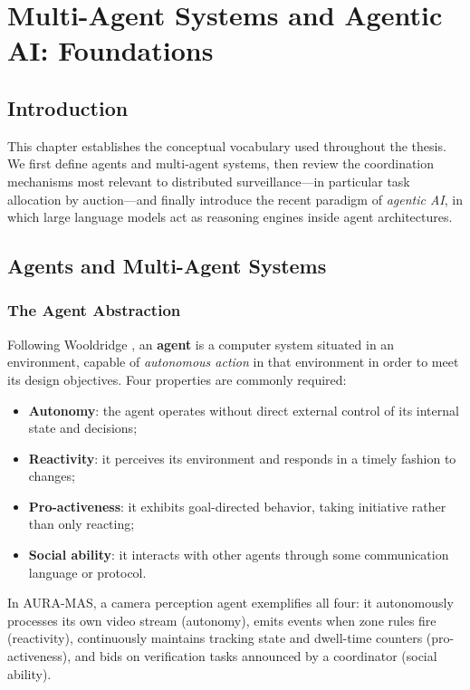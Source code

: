 \chapter{Multi-Agent Systems and Agentic AI: Foundations}
\label{chap:background_mas}

\section{Introduction}

This chapter establishes the conceptual vocabulary used throughout the thesis. We first define agents and multi-agent systems, then review the coordination mechanisms most relevant to distributed surveillance---in particular task allocation by auction---and finally introduce the recent paradigm of \emph{agentic AI}, in which large language models act as reasoning engines inside agent architectures.

\section{Agents and Multi-Agent Systems}

\subsection{The Agent Abstraction}

Following Wooldridge \cite{wooldridge2009introduction}, an \textbf{agent} is a computer system situated in an environment, capable of \emph{autonomous action} in that environment in order to meet its design objectives. Four properties are commonly required:

\begin{itemize}
    \item \textbf{Autonomy}: the agent operates without direct external control of its internal state and decisions;
    \item \textbf{Reactivity}: it perceives its environment and responds in a timely fashion to changes;
    \item \textbf{Pro-activeness}: it exhibits goal-directed behavior, taking initiative rather than only reacting;
    \item \textbf{Social ability}: it interacts with other agents through some communication language or protocol.
\end{itemize}

In AURA-MAS, a camera perception agent exemplifies all four: it autonomously processes its own video stream (autonomy), emits events when zone rules fire (reactivity), continuously maintains tracking state and dwell-time counters (pro-activeness), and bids on verification tasks announced by a coordinator (social ability).

